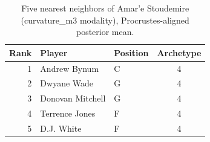 \begin{table}[htbp]
  \centering\small
  \begin{tabular}{rllc}
    \toprule
    Rank & Player & Position & Archetype \\
    \midrule
    1 & Andrew Bynum & C & 4 \\
    2 & Dwyane Wade & G & 4 \\
    3 & Donovan Mitchell & G & 4 \\
    4 & Terrence Jones & F & 4 \\
    5 & D.J. White & F & 4 \\
    \bottomrule
  \end{tabular}
  \caption{Five nearest neighbors of Amar'e Stoudemire (curvature_m3 modality), Procrustes-aligned posterior mean.}
  \label{tab:Amar_e_Stoudemire_neighbors_curvature_m3}
\end{table}

